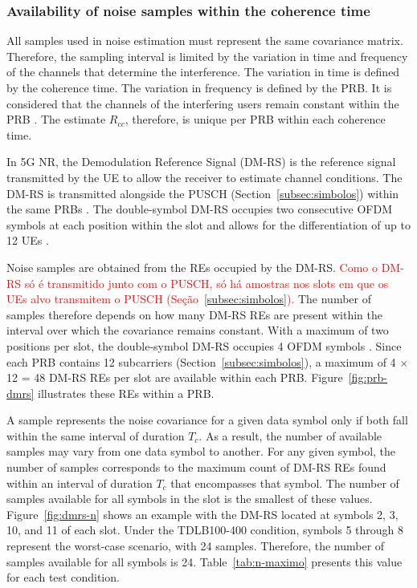 \subsubsection{Availability of noise samples within the coherence time}\label{subsubsec:disponibilidade-amostras}
All samples used in noise estimation must represent the same covariance matrix. Therefore, the sampling interval is limited by the variation in time and frequency of the channels that determine the interference. The variation in time is defined by the coherence time. The variation in frequency is defined by the PRB. It is considered that the channels of the interfering users remain constant within the PRB \cite{zhao2025jsac}. The estimate $R_{cc}$, therefore, is unique per PRB within each coherence time.


In 5G NR, the Demodulation Reference Signal (DM-RS) is the reference signal transmitted by the UE to allow the receiver to estimate channel conditions. The DM-RS is transmitted alongside the PUSCH (Section~\ref{subsec:simbolos}) within the same PRBs \cite[Sec.~6.4.1.1.3]{3gpp-ts38211}. The double-symbol DM-RS occupies two consecutive OFDM symbols at each position within the slot and allows for the differentiation of up to 12 UEs \textcolor{red}{\cite[Tabs.~6.4.1.1.3-2 e 6.4.1.1.3-5]{3gpp-ts38211}}.

Noise samples are obtained from the REs occupied by the DM-RS. \textcolor{red}{Como o DM-RS só é transmitido junto com o PUSCH, só há amostras nos slots em que os UEs alvo transmitem o PUSCH (Seção~\ref{subsec:simbolos}).} The number of samples therefore depends on how many DM-RS REs are present within the interval over which the covariance remains constant. With a maximum of two positions per slot, the double-symbol DM-RS occupies 4 OFDM symbols \cite[Tab.~6.4.1.1.3-4]{3gpp-ts38211}. Since each PRB contains 12 subcarriers (Section~\ref{subsec:simbolos}), a maximum of 4 $\times$ 12 = 48 DM-RS REs per slot are available within each PRB. Figure~\ref{fig:prb-dmrs} illustrates these REs within a PRB.



A sample represents the noise covariance for a given data symbol only if both fall within the same interval of duration $T_c$. As a result, the number of available samples may vary from one data symbol to another. For any given symbol, the number of samples corresponds to the maximum count of DM-RS REs found within an interval of duration $T_c$ that encompasses that symbol. The number of samples available for all symbols in the slot is the smallest of these values. Figure~\ref{fig:dmrs-n} shows an example with the DM-RS located at symbols 2, 3, 10, and 11 of each slot. Under the TDLB100-400 condition, symbols 5 through 8 represent the worst-case scenario, with 24 samples. Therefore, the number of samples available for all symbols is 24. Table~\ref{tab:n-maximo} presents this value for each test condition.

